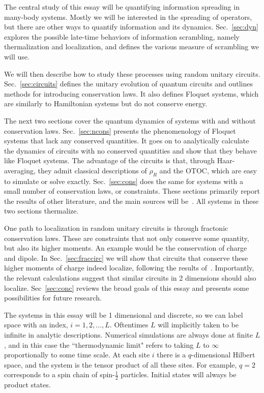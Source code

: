 \documentclass[a4paper,11pt]{article}
\newcommand{\half}{\frac{1}{2}}
\begin{document}
The central study of this essay will be quantifying information spreading in many-body systems. Mostly we will be interested in the spreading of operators, but there are other ways to quantify information and its dynamics. Sec.~\ref{sec:dyn} explores the possible late-time behaviors of information scrambling, namely thermalization and localization, and defines the various measure of scrambling we will use.

We will then describe how to study these processes using random unitary circuits. Sec.~\ref{sec:circuits} defines the unitary evolution of quantum circuits and outlines methods for introducing conservation laws. It also defines Floquet systems, which are similarly to Hamiltonian systems but do not conserve energy.

The next two sections cover the quantum dynamics of systems with and without conservation laws. Sec.~\ref{sec:ncons} presents the phenomenology of Floquet systems that lack any conserved quantities. It goes on to analytically calculate the dynamics of circuits with no conserved quantities and show that they behave like Floquet systems. The advantage of the circuits is that, through Haar-averaging, they admit classical descriptions of $\rho_R$ and the OTOC, which are easy to simulate or solve exactly.
Sec.~\ref{sec:cons} does the same for systems with a small number of conservation laws, or constraints. These sections primarily report the results of other literature, and the main sources will be~\cite{ChenOtoc, vonKeyserlingkHydro, NahumOpSp, KhemaniOpSp}. All systems in these two sections thermalize. 

One path to localization in random unitary circuits is through fractonic conservation laws. These are constraints that not only conserve some quantity, but also its higher moments. An example would be the conservation of charge and dipole. In Sec.~\ref{sec:fraccirc} we will show that circuits that conserve these higher moments of charge indeed localize, following the results of~\cite{PaiFracton}. Importantly, the relevant calculations suggest that similar circuits in 2 dimensions should also localize.
Sec~\ref{sec:conc} reviews the broad goals of this essay and presents some possibilities for future research.

The systems in this essay will be 1 dimensional and discrete, so we can label space with an index, $i = 1,2,\dots,L$. Oftentimes $L$ will implicitly taken to be infinite in analytic descriptions. Numerical simulations are always done at finite $L$, and in this case the ``thermodynamic limit" refers to taking $L$ to $\infty$ proportionally to some time scale. At each site $i$ there is a $q$-dimensional Hilbert space, and the system is the tensor product of all these sites. For example, $q=2$ corresponds to a spin chain of spin-$\half$ particles. Initial states will always be product states.
\end{document}
